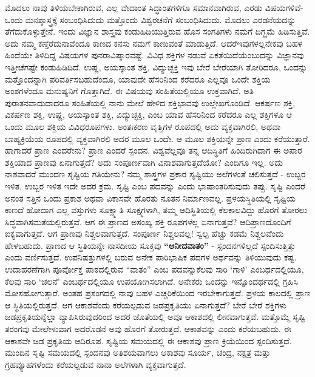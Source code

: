 ಮೊದಲು ನಾವು ತಿಳಿಯಬೇಕಾಗಿರುವ, ಎಲ್ಲ ವೇದಾಂತ ಸಿದ್ಧಾಂತಗಳಿಗೂ ಸಮಾನವಾಗಿರುವ, ಎರಡು ವಿಷಯಗಳಿವೆ-ಒಂದು ಮನಶ್ಶಾಸ್ತ್ರಕ್ಕೆ ಸಂಬಂಧಿ\-ಸಿದುದು ಮತ್ತೊಂದು ವಿಶ್ವರಚನೆಗೆ ಸಂಬಂಧಿಸಿದುದು. ಮೊದಲು ಎರಡನೆಯದನ್ನು ತೆಗೆದುಕೊಳ್ಳುತ್ತೇನೆ. ಇಂದು ವಿಜ್ಞಾನ ಶಾಸ್ತ್ರವು ಕಂಡುಹಿಡಿಯುತ್ತಿರುವ ಹೊಸ ಸಂಗತಿಗಳು ನಮಗೆ ದಿಗ್ಭ್ರಮೆ ಹಿಡಿಸುತ್ತಿವೆ. ಅದು ನಮ್ಮ ಕಣ್ತೆರೆದು\break ನಾವೆಂದೂ ಕಾಣದ ಕನಸು ನಮಗೆ ಕಾಣುವಂತೆ ಮಾಡುತ್ತಿದೆ. ಆದರೆ\break ಇವುಗಳಲ್ಲನೇಕವು ಬಹಳ ಹಿಂದೆಯೇ ತಿಳಿದಿದ್ದ ವಿಷಯಗಳ ಪುನರಾವಿಷ್ಕಾರವಷ್ಟೆ. ವಿವಿಧ ಶಕ್ತಿಗಳ ನಡುವೆ ಏಕತೆಯಿದೆಯೆಂಬುದನ್ನು ವಿಜ್ಞಾನವು ಇತ್ತೀಚೆಗಷ್ಟೇ ಕಂಡುಹಿಡಿದಿದೆ. ಉಷ್ಣ, ಅಯಸ್ಕಾಂತ ಶಕ್ತಿ, ವಿದ್ಯುಚ್ಛಕ್ತಿ ಇವು ಬೇರೆ ಬೇರೆಯಾಗಿ ತೋರಿದರೂ, ಒಂದನ್ನು ಮತ್ತೊಂದನ್ನಾಗಿ ಪರಿವರ್ತಿಸಬಹುದೆಂದೂ, ಯಾವುದೇ ಹೆಸರಿನಿಂದ ಕರೆದರೂ ಎಲ್ಲವೂ ಒಂದೇ ಶಕ್ತಿಯ ಅಂಶಗಳೆಂದೂ ಮನುಷ್ಯನಿಗೆ ಗೊತ್ತಾಗಿದೆ. ಈ ವಿಷಯವು ಸಂಹಿತೆಯಲ್ಲಿಯೂ ಉಕ್ತವಾಗಿದೆ. ಅತಿ ಪುರಾತನವಾದುದಾದರೂ ಸಂಹಿತೆಯಲ್ಲಿ ನಾನು ಮೇಲೆ ಹೇಳಿದ ಶಕ್ತಿಭಾವವು ಉಲ್ಲೇಖಗೊಂಡಿದೆ. ಆಕರ್ಷಣ ಶಕ್ತಿ, ವಿಕರ್ಷಣ ಶಕ್ತಿ, ಉಷ್ಣ, ಅಯಸ್ಕಾಂತ ಶಕ್ತಿ, ವಿದ್ಯುಚ್ಛಕ್ತಿ, ಎಂಬ ಯಾವ ಹೆಸರಿನಿಂದ ಕರೆದರೂ ಎಲ್ಲ ಶಕ್ತಿಗಳೂ ಆ ಒಂದು ಮೂಲ ಶಕ್ತಿಯ ವಿವಿಧರೂಪಗಳು. ಅಂತಃಕರಣ ವೃತ್ತಿಗಳ ರೂಪದಲ್ಲಿ ಅದು ವ್ಯಕ್ತವಾಗಿರಲಿ, ಅಥವಾ ಬಾಹ್ಯಕ್ರಿಯೆಯ ರೂಪದಲ್ಲಿ ವ್ಯಕ್ತವಾಗಿರಲಿ ಅದರ ಮೂಲ ಒಂದೇ. ಆ ಮೂಲ ಶಕ್ತಿಯನ್ನೇ ಪ್ರಾಣ ಎಂದು ಕರೆಯುತ್ತಾರೆ. ಹಾಗಾದರೆ ಪ್ರಾಣ ಎಂದರೇನು? ಪ್ರಾಣ ಎಂದರೆ ಸ್ಪಂದನ. ವಿಶ್ವವೆಲ್ಲವೂ ತನ್ನ ಆದಿಸ್ಥಿತಿಗೆ ಹಿಂದಿರುಗಿದಾಗ ಈ ಅಪಾರ ಶಕ್ತಿಯಾದ ಪ್ರಾಣವು ಏನಾಗುತ್ತದೆ? ಅದು ಸಂಪೂರ್ಣವಾಗಿ ವಿನಾಶವಾಗುತ್ತದೆಯೋ? ಎಂದಿಗೂ ಇಲ್ಲ. ಅದು ನಾಶವಾದರೆ ಮುಂದಣ ಸೃಷ್ಟಿಯ ಗತಿಯೇನು? ನಮ್ಮ ಶಾಸ್ತ್ರಗಳ ಪ್ರಕಾರ ಸೃಷ್ಟಿಯು ಅಲೆಗಳಂತೆ ಚಲಿಸುತ್ತದೆ - ಉಬ್ಬರ ಇಳಿತ, ಉಬ್ಬರ ಇಳಿತ ಇದೇ ಅದರ ಕ್ರಮ. ಸೃಷ್ಟಿ ಎಂಬ ಪದವನ್ನು  ಎಂದು ಭಾಷಾಂತರಿಸುವುದು ತಪ್ಪು. ಸೃಷ್ಟಿ ಎಂದರೆ ಅನಂತ ಸತ್ತಿನ ಒಂದು ಪ್ರಕಾಶ ಅಥವಾ ವಿಕಾಸವೇ ಹೊರತು ನೂತನ ನಿರ್ಮಾಣವಲ್ಲ. ಪ್ರಳಯಸ್ಥಿತಿಯಲ್ಲಿ ಸೃಷ್ಟಿಯ ಕಾಣದೆ ಹೋದಾಗ ಎಲ್ಲ ವಸ್ತುಗಳು ಸೂಕ್ಷ್ಮಾತಿ ಸೂಕ್ಷ್ಮಗಳಾಗಿ, ತಮ್ಮ ಆದಿಸ್ಥಿತಿಯಲ್ಲಿ ಕೆಲಕಾಲವಿದ್ದು ಹೊರಗೆ ತೋರಲು ಸಿದ್ಧವಾಗಿ\break ಸಮತೆಯಲ್ಲಿರುತ್ತವೆ. ಆಗ ಈ ಪ್ರಾಣದ ಅಸಂಖ್ಯ ಶಕ್ತಿ ರೂಪಗಳೆಲ್ಲ ಏನಾಗು\-ತ್ತವೆ? ಆದಿಪ್ರಾಣದೊಂದಿಗೆ ಐಕ್ಯವಾಗುತ್ತದೆ. ಆಗ ಪ್ರಾಣವು ನಿಶ್ಚಲವಾಗುತ್ತದೆ. ಸಂಪೂರ್ಣ ನಿಶ್ಚಲವಲ್ಲ! ಸ್ವಲ್ಪ ಹೆಚ್ಚು ಕಡಮೆ ನಿಶ್ಚಲವೆಂದು ಹೇಳಬಹುದು. ಪ್ರಾಣದ ಆ ಸ್ಥಿತಿಯನ್ನೇ ನಾಸದೀಯ ಸೂಕ್ತವು \textbf{“ಆನೀದವಾತಂ”} - ಸ್ಪಂದನಗಳಿಲ್ಲದೆ ಸ್ಪಂದಿಸುತ್ತಿತ್ತು ಎಂದು ವರ್ಣಿಸುತ್ತದೆ. ಉಪನಿಷತ್ತುಗಳಲ್ಲಿ ಬರುವ ಅನೇಕ ಪಾರಿಭಾಷಿಕ ಪದಗಳ ಅರ್ಥವನ್ನು ತಿಳಿಯುವುದು ಕಷ್ಟ. ಉದಾ\-ಹರಣೆಗಾಗಿ ಪೂರ್ವೋಕ್ತ ಪಾಠದಲ್ಲಿರುವ “ವಾತಂ” ಎಂಬ ಪದವನ್ನುಕೆಲವು ಸಾರಿ ‘ಗಾಳಿ’ ಎಂಬರ್ಥದಲ್ಲಿಯೂ, ಕೆಲವು ಸಾರಿ ‘ಚಲನೆ’ ಎಂಬರ್ಥದಲ್ಲಿಯೂ ಉಪಯೋಗಿಸಲಾಗಿದೆ. ಅನೇಕರು ಒಂದನ್ನು ಇನ್ನೊಂದರ್ಥದಲ್ಲಿ ಗ್ರಹಿಸಿ ಮೋಸಹೋಗುತ್ತಾರೆ. ಅಂತಹ ಪ್ರಸಂಗದಲ್ಲಿ ನಾವು ಬಹಳ ಎಚ್ಚರಿಕೆಯಿಂದ ಇರಬೇಕಾಗುತ್ತದೆ. ಪ್ರಳಯ ಕಾಲದಲ್ಲಿ ಪ್ರಾಣ ಆ ಸ್ಥಿತಿಯಲ್ಲಿರುತ್ತದೆ. ಆಗ ಆಕಾಶವೆಂದು ಕರೆಯಲ್ಪಡುವ ಜಡಪ್ರಕೃತಿಯು ಏನಾಗುತ್ತದೆ? ಬೇರೆ ಬೇರೆ ಶಕ್ತಿಗಳು ಜಡಪ್ರಕೃತಿಯನ್ನೆಲ್ಲಾ ವ್ಯಾಪಿಸಿರುವುದರಿಂದ ಅದರ ಜೊತೆಯಲ್ಲಿ ಅವೂ ಆಕಾಶದಲ್ಲಿ ಲೀನವಾಗುತ್ತವೆ. ಮತ್ತೊಮ್ಮೆ ಸೃಷ್ಟಿ ತರಂಗವು ಮೇಲೇಳುವಾಗ ಅದರೊಡನೆ ಅವು ಹೊರಗೆ ತೋರುತ್ತದೆ. ಆಕಾಶವನ್ನು  ಎಂದು ಕರೆಯಬಹುದು. ಈ ಆಕಾಶವೇ ಜಡ ಪ್ರಕೃತಿಯ ಆದಿರೂಪ. ಸೃಷ್ಟಿಯ ಸಮಯದಲ್ಲಿ ಈ ಆಕಾಶವು ಪ್ರಾಣ ಕ್ರಿಯೆಯಿಂದ ಸ್ಪಂದಿಸುತ್ತದೆ. ಮುಂದಿನ ಸೃಷ್ಟಿ ಸಮಯದಲ್ಲಿ ಸ್ಪಂದನವು ಅತಿಶಯವಾಗಲು ಆಕಾಶವು ಸೂರ್ಯ, ಚಂದ್ರ, ನಕ್ಷತ್ರ ಮತ್ತು ಗ್ರಹವ್ಯೂಹಗಳೆಂದು ಕರೆಯಲ್ಪಡುವ ನಾನಾ ಅಲೆಗಳಾಗಿ ವ್ಯಕ್ತವಾಗುತ್ತದೆ.

